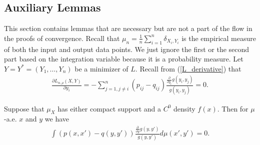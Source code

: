\subsection{Auxiliary Lemmas}\label{tsne:sec:extra_proofs}
This section contains lemmas that are necessary but are not a part of the flow
in the proofs of convergence. Recall that $\mu_n = \frac{1}{n}\sum_{i=1}^n
    \delta_{X_i,Y_i}$ is the empirical measure of both the input and output data
points. We just ignore the first or the second part based on the integration
variable because it is a probability measure. Let $Y = Y^* = (Y_1,\dots,Y_n)$
be a minimizer of $L$. Recall from (\ref{L_derivative}) that
\begin{align}
    \frac{\partial L_{n, \rho}(X,Y)}{\partial y_i} = -\sum_{j=1, j \neq i}^n (p_{ij}-q_{ij}) \frac{\frac{\partial}{\partial y_i}g(y_i,y_j)}{g(y_i,y_j)} = 0.
\end{align}
\begin{lemma} \label{appendix_lemma}
    Suppose that $\mu_X$ has either compact support and a $C^0$ density $f(x)$. Then for $\mu$-a.e. $x$ and $y$ we have
    \begin{align}
        \int (p(x,x')-q(y,y')) \frac{\frac{\partial}{\partial y}g(y,y')}{g(y,y')} d\mu(x',y') = 0.
    \end{align}
\end{lemma}
